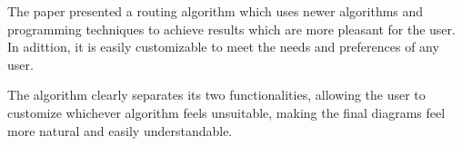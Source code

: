 The paper presented a routing algorithm which uses newer algorithms and
programming techniques to achieve results which are more pleasant for the
user. In adittion, it is easily customizable to meet the needs and 
preferences of any user.

The algorithm clearly separates its two functionalities, allowing the 
user to customize whichever algorithm feels unsuitable, making the 
final diagrams feel more natural and easily understandable.
